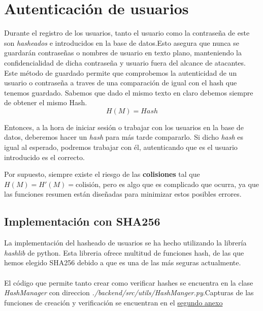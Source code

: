 \documentclass[a4paper,11pt]{article}
\begin{document}


\section{Autenticación de usuarios}
\label{sec:autenticacionUsuarios}
Durante el registro de los usuarios, tanto el usuario como la contraseña de este
son \textit{hasheados} e introducidos en la base de datos.Esto asegura que nunca
se guardarán contraseñas o nombres de usuario en texto plano, manteniendo la
confidencialidad de dicha contraseña y usuario fuera del alcance de atacantes.
\\
Este método de guardado permite que comprobemos la autenticidad de un usuario o
contraseña a traves de una comparación de igual con el hash que tenemos
guardado. Sabemos que dado el mismo texto en claro debemos siempre de obtener el
mismo Hash.
$$H(M) = Hash$$

Entonces, a la hora de iniciar sesión o trabajar con los usuarios en la base de datos, deberemos hacer un \textit{hash} para más tarde compararlo. Si dicho \textit{hash} es igual al esperado, podremos trabajar con él, autenticando que es el usuario introducido es el correcto.

Por supuesto, siempre existe el riesgo de las \textbf{colisiones} tal que $H(M) = H'(M) = \text{colisión}$, pero es algo que es complicado que ocurra, ya que las funciones resumen están diseñadas para minimizar estos posibles errores.


\subsection{Implementación con SHA256}

La implementación del hasheado de usuarios se ha hecho utilizando la librería
\textit{hashlib} de python. Esta libreria ofrece multitud de funciones hash, de
las que hemos elegido SHA256 debido a que es una de las más seguras
actualmente.\\\\
El código que permite tanto crear como verificar hashes se encuentra en la clase
\textit{HashManager} con direccion
\textit{./backend/src/utils/HashManger.py}.Capturas de las funciones de creación y
verificación se encuentran en el \hyperref[sec:funcionesHash]{segundo anexo}
\end{document}
